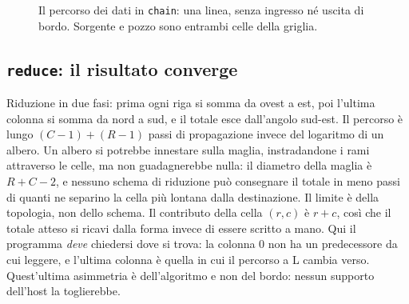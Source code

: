\begin{figure}[htbp]
    \centering
    \caption{Il percorso dei dati in \texttt{chain}: una linea, senza ingresso
             né uscita di bordo. Sorgente e pozzo sono entrambi celle della
             griglia.}
    \label{fig:chain}
\end{figure}

\subsection{\texttt{reduce}: il risultato converge}

Riduzione in due fasi: prima ogni riga si somma da ovest a est, poi l'ultima
colonna si somma da nord a sud, e il totale esce dall'angolo sud-est. Il
percorso è lungo $(C-1) + (R-1)$ passi di propagazione invece del logaritmo di un
albero. Un albero si potrebbe innestare sulla maglia, instradandone i rami
attraverso le celle, ma non guadagnerebbe nulla: il diametro della maglia è
$R+C-2$, e nessuno schema di riduzione può consegnare il totale in meno
passi di quanti ne separino la cella più lontana dalla destinazione.
Il limite è della topologia, non dello schema.
Il contributo della cella $(r,c)$ è $r+c$, così che il totale atteso
si ricavi dalla forma invece di essere scritto a mano. Qui il programma
\emph{deve} chiedersi dove si trova: la colonna 0 non ha un predecessore da cui
leggere, e l'ultima colonna è quella in cui il percorso a L cambia verso.
Quest'ultima asimmetria è dell'algoritmo e non del bordo: nessun supporto
dell'host la toglierebbe.

